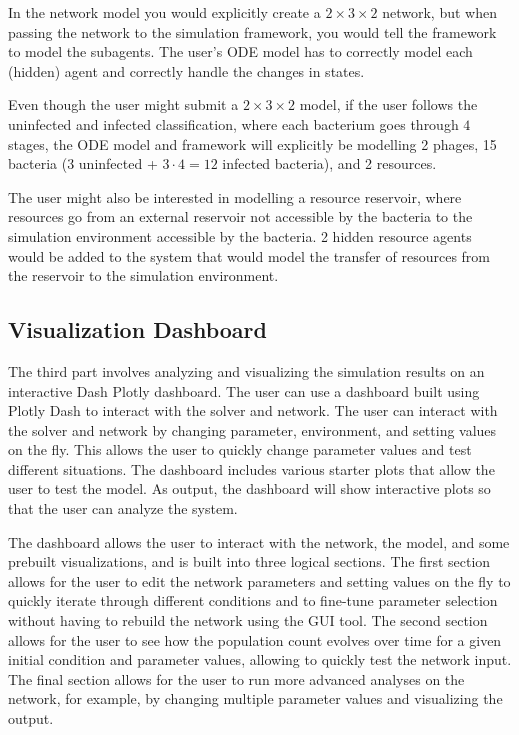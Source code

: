 In the network model you would explicitly create a $2\times 3 \times 2$ network, but when passing the network to the simulation framework, you would tell the framework to model the subagents. 
The user's ODE model has to correctly model each (hidden) agent and correctly handle the changes in states. 

Even though the user might submit a $2 \times 3 \times 2$ model, if the user follows the uninfected and infected classification, where each bacterium goes through $4$ stages, the ODE model and framework will explicitly be modelling 2 phages, 15 bacteria (3 uninfected + $3\cdot 4=12$ infected bacteria), and 2 resources. 

The user might also be interested in modelling a resource reservoir, where resources go from an external reservoir not accessible by the bacteria to the simulation environment accessible by the bacteria. 
2 hidden resource agents would be added to the system that would model the transfer of resources from the reservoir to the simulation environment. 

\subsection{Visualization Dashboard}
\label{sec:visualization_framework}
The third part involves analyzing and visualizing the simulation results on an interactive Dash Plotly \cite{DashDocumentationUser} dashboard. 
The user can use a dashboard built using Plotly Dash to interact with the solver and network.
The user can interact with the solver and network by changing parameter, environment, and setting values on the fly.
This allows the user to quickly change parameter values and test different situations.
The dashboard includes various starter plots that allow the user to test the model.
As output, the dashboard will show interactive plots so that the user can analyze the system. 


The dashboard allows the user to interact with the network, the model, and some prebuilt visualizations, and is built into three logical sections.
The first section allows for the user to edit the network parameters and setting values on the fly to quickly iterate through different conditions and to fine-tune parameter selection without having to rebuild the network using the GUI tool.
The second section allows for the user to see how the population count evolves over time for a given initial condition and parameter values, allowing to quickly test the network input.
The final section allows for the user to run more advanced analyses on the network, for example, by changing multiple parameter values and visualizing the output. 

